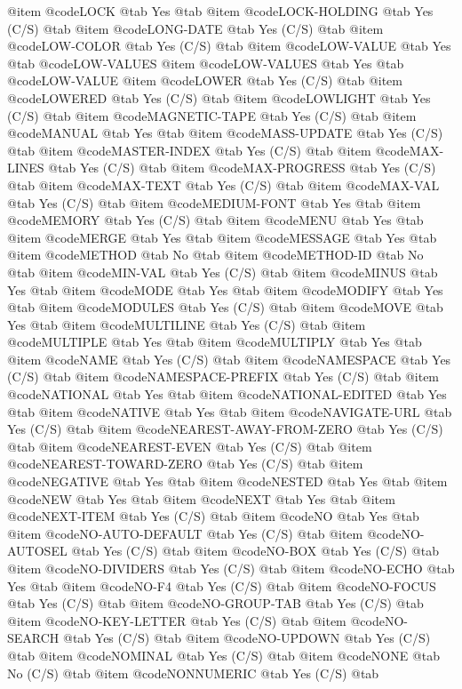 @item @code{LOCK} @tab Yes @tab 
@item @code{LOCK-HOLDING} @tab Yes	(C/S) @tab 
@item @code{LONG-DATE} @tab Yes	(C/S) @tab 
@item @code{LOW-COLOR} @tab Yes	(C/S) @tab 
@item @code{LOW-VALUE} @tab Yes @tab @code{LOW-VALUES}
@item @code{LOW-VALUES} @tab Yes @tab @code{LOW-VALUE}
@item @code{LOWER} @tab Yes	(C/S) @tab 
@item @code{LOWERED} @tab Yes	(C/S) @tab 
@item @code{LOWLIGHT} @tab Yes	(C/S) @tab 
@item @code{MAGNETIC-TAPE} @tab Yes	(C/S) @tab 
@item @code{MANUAL} @tab Yes @tab 
@item @code{MASS-UPDATE} @tab Yes	(C/S) @tab 
@item @code{MASTER-INDEX} @tab Yes	(C/S) @tab 
@item @code{MAX-LINES} @tab Yes	(C/S) @tab 
@item @code{MAX-PROGRESS} @tab Yes	(C/S) @tab 
@item @code{MAX-TEXT} @tab Yes	(C/S) @tab 
@item @code{MAX-VAL} @tab Yes	(C/S) @tab 
@item @code{MEDIUM-FONT} @tab Yes @tab 
@item @code{MEMORY} @tab Yes	(C/S) @tab 
@item @code{MENU} @tab Yes @tab 
@item @code{MERGE} @tab Yes @tab 
@item @code{MESSAGE} @tab Yes @tab 
@item @code{METHOD} @tab No @tab 
@item @code{METHOD-ID} @tab No @tab 
@item @code{MIN-VAL} @tab Yes	(C/S) @tab 
@item @code{MINUS} @tab Yes @tab 
@item @code{MODE} @tab Yes @tab 
@item @code{MODIFY} @tab Yes @tab 
@item @code{MODULES} @tab Yes	(C/S) @tab 
@item @code{MOVE} @tab Yes @tab 
@item @code{MULTILINE} @tab Yes	(C/S) @tab 
@item @code{MULTIPLE} @tab Yes @tab 
@item @code{MULTIPLY} @tab Yes @tab 
@item @code{NAME} @tab Yes	(C/S) @tab 
@item @code{NAMESPACE} @tab Yes	(C/S) @tab 
@item @code{NAMESPACE-PREFIX} @tab Yes	(C/S) @tab 
@item @code{NATIONAL} @tab Yes @tab 
@item @code{NATIONAL-EDITED} @tab Yes @tab 
@item @code{NATIVE} @tab Yes @tab 
@item @code{NAVIGATE-URL} @tab Yes	(C/S) @tab 
@item @code{NEAREST-AWAY-FROM-ZERO} @tab Yes	(C/S) @tab 
@item @code{NEAREST-EVEN} @tab Yes	(C/S) @tab 
@item @code{NEAREST-TOWARD-ZERO} @tab Yes	(C/S) @tab 
@item @code{NEGATIVE} @tab Yes @tab 
@item @code{NESTED} @tab Yes @tab 
@item @code{NEW} @tab Yes @tab 
@item @code{NEXT} @tab Yes @tab 
@item @code{NEXT-ITEM} @tab Yes	(C/S) @tab 
@item @code{NO} @tab Yes @tab 
@item @code{NO-AUTO-DEFAULT} @tab Yes	(C/S) @tab 
@item @code{NO-AUTOSEL} @tab Yes	(C/S) @tab 
@item @code{NO-BOX} @tab Yes	(C/S) @tab 
@item @code{NO-DIVIDERS} @tab Yes	(C/S) @tab 
@item @code{NO-ECHO} @tab Yes @tab 
@item @code{NO-F4} @tab Yes	(C/S) @tab 
@item @code{NO-FOCUS} @tab Yes	(C/S) @tab 
@item @code{NO-GROUP-TAB} @tab Yes	(C/S) @tab 
@item @code{NO-KEY-LETTER} @tab Yes	(C/S) @tab 
@item @code{NO-SEARCH} @tab Yes	(C/S) @tab 
@item @code{NO-UPDOWN} @tab Yes	(C/S) @tab 
@item @code{NOMINAL} @tab Yes	(C/S) @tab 
@item @code{NONE} @tab No	(C/S) @tab 
@item @code{NONNUMERIC} @tab Yes	(C/S) @tab 

